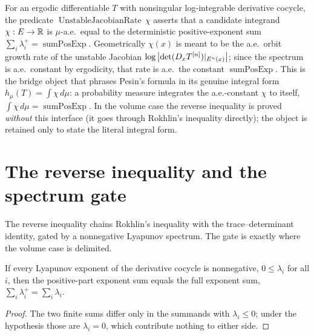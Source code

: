 \begin{definition}\label{UnstableJacobianRate}
  \leanok
  For an ergodic differentiable \(T\) with nonsingular log-integrable derivative cocycle, the
  predicate \(\operatorname{UnstableJacobianRate}\,\chi\) asserts that a candidate integrand
  \(\chi:E\to\mathbb{R}\) is \(\mu\)-a.e.\ equal to the deterministic positive-exponent sum
  \(\sum_i\lambda_i^{+}=\operatorname{sumPosExp}\). Geometrically \(\chi(x)\) is meant to be the
  a.e.\ orbit growth rate of the unstable Jacobian \(\log\left\lvert \det (D_xT^{[n]})|_{E^u(x)} \right\rvert\); since
  the spectrum is a.e.\ constant by ergodicity, that rate is a.e.\ the constant
  \(\operatorname{sumPosExp}\). This is the bridge object that phrases Pesin's formula in its
  genuine integral form \(h_\mu(T)=\int\chi\,d\mu\): a probability measure integrates the
  a.e.-constant \(\chi\) to itself, \(\int\chi\,d\mu=\operatorname{sumPosExp}\). In the volume case
  the reverse inequality is proved \emph{without} this interface (it goes through Rokhlin's
  inequality directly); the object is retained only to state the literal integral form.
\end{definition}

\section{The reverse inequality and the spectrum gate}

The reverse inequality chains Rokhlin's inequality with the trace--determinant identity, gated by a
nonnegative Lyapunov spectrum. The gate is exactly where the volume case is delimited.

\begin{lemma}\label{sumPosExp_eq_sumAllExp_of_nonneg}
  \leanok
  If every Lyapunov exponent of the derivative cocycle is nonnegative,
  \(0\le\lambda_i\) for all \(i\), then the positive-part exponent sum equals the full exponent
  sum, \(\sum_i\lambda_i^{+}=\sum_i\lambda_i\).
\end{lemma}
\begin{proof}\leanok
  The two finite sums differ only in the summands with \(\lambda_i\le 0\); under the hypothesis
  those are \(\lambda_i=0\), which contribute nothing to either side.
\end{proof}

